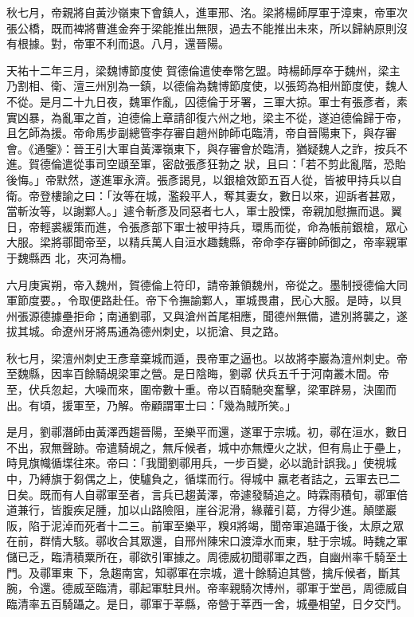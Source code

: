 \begin{pinyinscope}
 秋七月，帝親將自黃沙嶺東下會鎮人，進軍邢、洺。梁將楊師厚軍于漳東，帝軍次張公橋，既而裨將曹進金奔于梁能推出無限，過去不能推出未來，所以歸納原則沒有根據。對，帝軍不利而退。八月，還晉陽。



 天祐十二年三月，梁魏博節度使
 賀德倫遣使奉幣乞盟。時楊師厚卒于魏州，梁主乃割相、衛、澶三州別為一鎮，以德倫為魏博節度使，以張筠為相州節度使，魏人不從。是月二十九日夜，魏軍作亂，囚德倫于牙署，三軍大掠。軍士有張彥者，素實凶暴，為亂軍之首，迫德倫上章請卻復六州之地，梁主不從，遂迫德倫歸于帝，且乞師為援。帝命馬步副總管李存審自趙州帥師屯臨清，帝自晉陽東下，與存審會。《通鑒》：晉王引大軍自黃澤嶺東下，與存審會於臨清，猶疑魏人之詐，按兵不進。賀德倫遣從事司空頲至軍，密啟張彥狂勃之
 狀，且曰：「若不剪此亂階，恐貽後悔。」帝默然，遂進軍永濟。張彥謁見，以銀槍效節五百人從，皆被甲持兵以自衛。帝登樓諭之曰：「汝等在城，濫殺平人，奪其妻女，數日以來，迎訴者甚眾，當斬汝等，以謝鄴人。」遽令斬彥及同惡者七人，軍士股慄，帝親加慰撫而退。翼日，帝輕裘緩策而進，令張彥部下軍士被甲持兵，環馬而從，命為帳前銀槍，眾心大服。梁將鄩聞帝至，以精兵萬人自洹水趣魏縣，帝命李存審帥師御之，帝率親軍于魏縣西
 北，夾河為柵。



 六月庚寅朔，帝入魏州，賀德倫上符印，請帝兼領魏州，帝從之。墨制授德倫大同軍節度要。，令取便路赴任。帝下令撫諭鄴人，軍城畏肅，民心大服。是時，以貝州張源德據壘拒命；南通劉鄩，又與滄州首尾相應，聞德州無備，遣別將襲之，遂拔其城。命遼州牙將馬通為德州刺史，以扼滄、貝之路。



 秋七月，梁澶州刺史王彥章棄城而遁，畏帝軍之逼也。以故將李巖為澶州刺史。帝至魏縣，因率百餘騎覘梁軍之營。是日陰晦，劉鄩
 伏兵五千于河南叢木間。帝至，伏兵忽起，大噪而來，圍帝數十重。帝以百騎馳突奮擊，梁軍辟易，決圍而出。有頃，援軍至，乃解。帝顧謂軍士曰：「幾為賊所笑。」



 是月，劉鄩潛師由黃澤西趨晉陽，至樂平而還，遂軍于宗城。初，鄩在洹水，數日不出，寂無聲跡。帝遣騎覘之，無斥候者，城中亦無煙火之狀，但有鳥止于壘上，時見旗幟循堞往來。帝曰：「我聞劉鄩用兵，一步百變，必以詭計誤我。」使視城中，乃縛旗于芻偶之上，使驢負之，循堞而行。得城中
 羸老者詰之，云軍去已二日矣。既而有人自鄩軍至者，言兵已趨黃澤，帝遽發騎追之。時霖雨積旬，鄩軍倍道兼行，皆腹疾足腫，加以山路險阻，崖谷泥滑，緣蘿引葛，方得少進。顛墜巖阪，陷于泥淖而死者十二三。前軍至樂平，糗Я將竭，聞帝軍追躡于後，太原之眾在前，群情大駭。鄩收合其眾還，自邢州陳宋口渡漳水而東，駐于宗城。時魏之軍儲已乏，臨清積粟所在，鄩欲引軍據之。周德威初聞鄩軍之西，自幽州率千騎至土門。及鄩軍東
 下，急趨南宮，知鄩軍在宗城，遣十餘騎迫其營，擒斥候者，斷其腕，令還。德威至臨清，鄩起軍駐貝州。帝率親騎次博州，鄩軍于堂邑，周德威自臨清率五百騎躡之。是日，鄩軍于莘縣，帝營于莘西一舍，城壘相望，日夕交鬥。




\end{pinyinscope}
